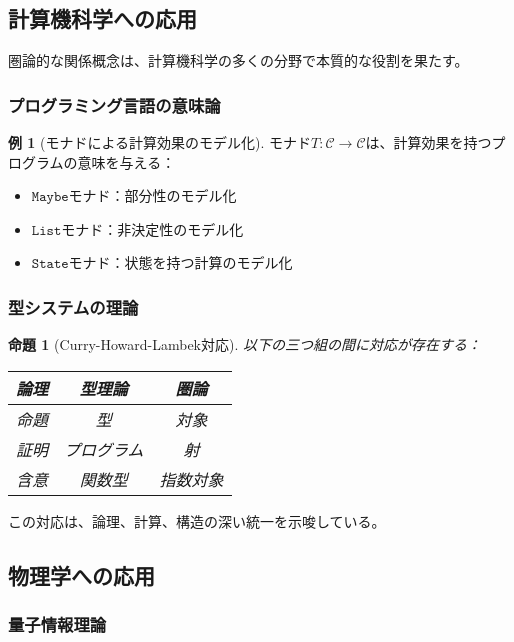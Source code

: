 \documentclass[11pt,a4paper,twocolumn]{ltjsarticle}
\theoremstyle{definition}
\newtheorem{example}[definition]{例}
\theoremstyle{plain}
\newtheorem{proposition}[definition]{命題}
\begin{document}
\subsection{計算機科学への応用}

圏論的な関係概念は、計算機科学の多くの分野で本質的な役割を果たす。

\subsubsection{プログラミング言語の意味論}

\begin{example}[モナドによる計算効果のモデル化]
モナド$T: \mathcal{C} \to \mathcal{C}$は、計算効果を持つプログラムの意味を与える：
\begin{itemize}
\item $\mathtt{Maybe}$モナド：部分性のモデル化
\item $\mathtt{List}$モナド：非決定性のモデル化
\item $\mathtt{State}$モナド：状態を持つ計算のモデル化
\end{itemize}
\end{example}

\subsubsection{型システムの理論}

\begin{proposition}[Curry-Howard-Lambek対応]
以下の三つ組の間に対応が存在する：
\begin{center}
\begin{tabular}{ccc}
論理 & 型理論 & 圏論 \\
\hline
命題 & 型 & 対象 \\
証明 & プログラム & 射 \\
含意 & 関数型 & 指数対象 \\
\end{tabular}
\end{center}
\end{proposition}

この対応は、論理、計算、構造の深い統一を示唆している。

\subsection{物理学への応用}

\subsubsection{量子情報理論}
\end{document}
